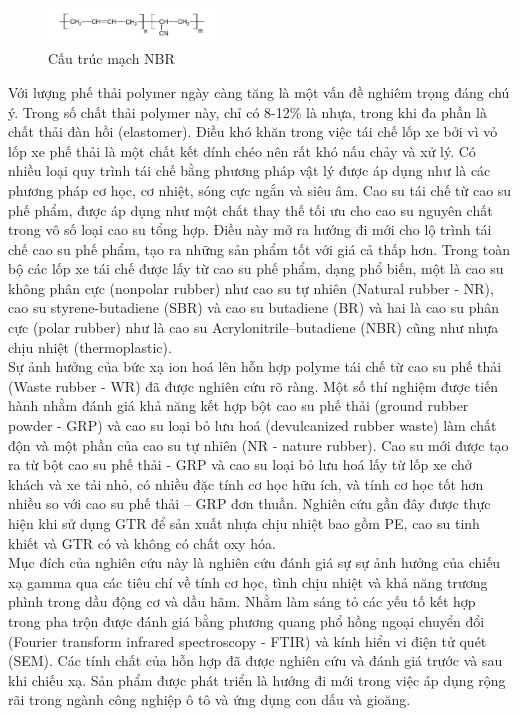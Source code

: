 \documentclass[12pt,a4paper]{article}
\begin{document}
	\begin{figure}[h]
		\centering
		\includegraphics[width=0.4\textwidth]{1.jpg}
		\caption{Cấu trúc mạch NBR}
		\vspace{0.4em}
	\end{figure}
	
Với lượng phế thải polymer ngày càng tăng là một vấn đề nghiêm trọng đáng chú ý. Trong số chất thải polymer này, chỉ có 8-12\% là nhựa, trong khi đa phần là chất thải đàn hồi (elastomer). Điều khó khăn trong việc tái chế lốp xe bởi vì vỏ lốp xe phế thải là một chất kết dính chéo nên rất khó nấu chảy và xử lý. Có nhiều loại quy trình tái chế bằng phương pháp vật lý được áp dụng như là các phương pháp cơ học, cơ nhiệt, sóng cực ngắn và siêu âm. Cao su tái chế từ cao su phế phẩm, được áp dụng như một chất thay thế tối ưu cho cao su nguyên chất trong vô số loại cao su tổng hợp. Điều này mở ra hướng đi mới cho lộ trình tái chế cao su phế phẩm, tạo ra những sản phẩm tốt với giá cả thấp hơn. Trong toàn bộ các lốp xe tái chế được lấy từ cao su phế phẩm, dạng phổ biến, một là cao su không phân cực (nonpolar rubber) như cao su tự nhiên (Natural rubber - NR), cao su styrene-butadiene (SBR) và cao su butadiene (BR) và hai là cao su phân cực (polar rubber) như là cao su Acrylonitrile–butadiene (NBR) cũng như nhựa chịu nhiệt (thermoplastic).\\

Sự ảnh hưởng của bức xạ ion hoá lên hỗn hợp polyme tái chế từ cao su phế thải (Waste rubber - WR) đã được nghiên cứu rõ ràng. Một số thí nghiệm được tiến hành nhằm đánh giá khả năng kết hợp bột cao su phế thải (ground rubber powder - GRP) và cao su loại bỏ lưu hoá (devulcanized rubber waste) làm chất độn và một phần của cao su tự nhiên (NR - nature rubber). Cao su mới được tạo ra từ bột cao su phế thải - GRP và cao su loại bỏ lưu hoá lấy từ lốp xe chở khách và xe tải nhỏ, có nhiều đặc tính cơ học hữu ích, và tính cơ học tốt hơn nhiều so với cao su phế thải – GRP đơn thuần. Nghiên cứu gần đây được thực hiện khi sử dụng GTR để sản xuất nhựa chịu nhiệt bao gồm PE, cao su tinh khiết và GTR có và không có chất oxy hóa.\\

Mục đích của nghiên cứu này là nghiên cứu đánh giá sự sự ảnh hưởng của chiếu xạ gamma qua các tiêu chí về tính cơ học, tình chịu nhiệt và khả năng trương phình trong dầu động cơ và dầu hãm. Nhằm làm sáng tỏ các yếu tố kết hợp trong pha trộn được đánh giá bằng phương quang phổ hồng ngoại chuyển đổi (Fourier transform infrared spectroscopy - FTIR) và kính hiển vi điện tử quét (SEM). Các tính chất của hỗn hợp đã được nghiên cứu và đánh giá trước và sau khi chiếu xạ. Sản phẩm được phát triển là hướng đi mới trong việc áp dụng rộng rãi trong ngành công nghiệp ô tô và ứng dụng con dấu và gioăng.\\
\end{document}
